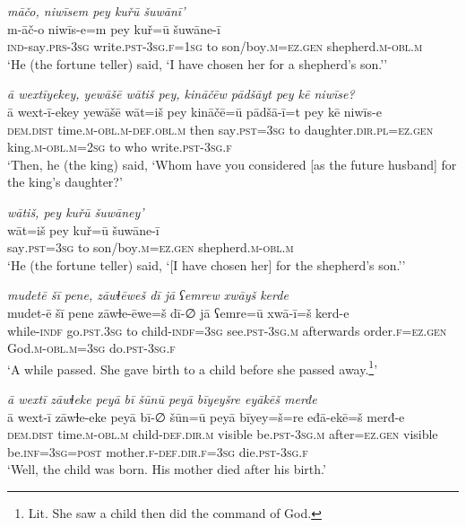 \ea \label{KŠ.13}
\textit{māčo, niwīsem pey kuřū šuwānī’} \\ 
\gll m-āč-o niwīs-e=m pey kuř=ū šuwāne-ī \\ 
 \textsc{ind-}say\textsc{.prs}\textsc{-3sg} write\textsc{.pst}\textsc{-3sg}\textsc{.f}\textsc{=\textsc{1sg}} to son/boy\textsc{.m}\textsc{=ez.gen} shepherd\textsc{.m}\textsc{-obl}\textsc{.m} \\ 
\glt `He (the fortune teller) said, ‘I have chosen her for a shepherd’s son.’'
\z 
 
\ea \label{KŠ.15}
\textit{ā wextīyekey, yewāšē wātiš pey, kināčēw pādšāyt pey kē niwīse?} \\ 
\gll ā wext-ī-ekey yewāšē wāt=iš pey kināčē=ū pādšā-ī=t pey kē niwīs-e \\ 
 \textsc{dem.dist} time\textsc{.m}\textsc{-obl}\textsc{.m}\textsc{-def}\textsc{.obl}\textsc{.m} then say\textsc{.pst}\textsc{=3sg} to daughter\textsc{.dir}\textsc{.pl}\textsc{=ez.gen} king\textsc{.m}\textsc{-obl}\textsc{.m}\textsc{=\textsc{2sg}} to who write\textsc{.pst}\textsc{-3sg}\textsc{.f} \\ 
\glt `Then, he (the king) said, ‘Whom have you considered [as the future husband] for the king’s daughter?'
\z 
 
\ea \label{KŠ.16}
\textit{wātiš, pey kuřū šuwāney’} \\ 
\gll wāt=iš pey kuř=ū šuwāne-ī \\ 
 say\textsc{.pst}\textsc{=3sg} to son/boy\textsc{.m}\textsc{=ez.gen} shepherd\textsc{.m}\textsc{-obl}\textsc{.m} \\ 
\glt `He (the fortune teller) said, ‘[I have chosen her] for the shepherd’s son.’'
\z 
 
\ea \label{KŠ.22}
\textit{mudetē šī pene, zāwɫēweš dī jā ʕemrew xwāyš kerde} \\ 
\gll mudet-ē šī pene zāwɫe-ēwe=š dī-∅ jā ʕemre=ū xwā-ī=š kerd-e \\ 
 while\textsc{-indf} go\textsc{.pst}\textsc{.3sg} to child\textsc{-indf}\textsc{=3sg} see\textsc{.pst}\textsc{-3sg}\textsc{.m} afterwards order\textsc{.f}\textsc{=ez.gen} God\textsc{.m}\textsc{-obl}\textsc{.m}\textsc{=3sg} do\textsc{.pst}\textsc{-3sg}\textsc{.f} \\ 
\glt `A while passed. She gave birth to a child before she passed away.\footnote{Lit. She saw a child then did the command of God.}'
\z 
 
\ea \label{KŠ.23}
\textit{ā wextī zāwɫeke peyā bī šūnū peyā bīyeyšre eyākēš merđe} \\ 
\gll ā wext-ī zāwɫe-eke peyā bī-∅ šūn=ū peyā bīyey=š=re eđā-ekē=š merđ-e \\ 
 \textsc{dem.dist} time\textsc{.m}\textsc{-obl}\textsc{.m} child\textsc{-def}\textsc{.dir}\textsc{.m} visible be\textsc{.pst}\textsc{-3sg}\textsc{.m} after\textsc{=ez.gen} visible be\textsc{.inf}\textsc{=3sg}\textsc{=\textsc{post}} mother\textsc{.f}\textsc{-def}\textsc{.dir}\textsc{.f}\textsc{=3sg} die\textsc{.pst}\textsc{-3sg}\textsc{.f} \\ 
\glt `Well, the child was born. His mother died after his birth.'
\z 
 
